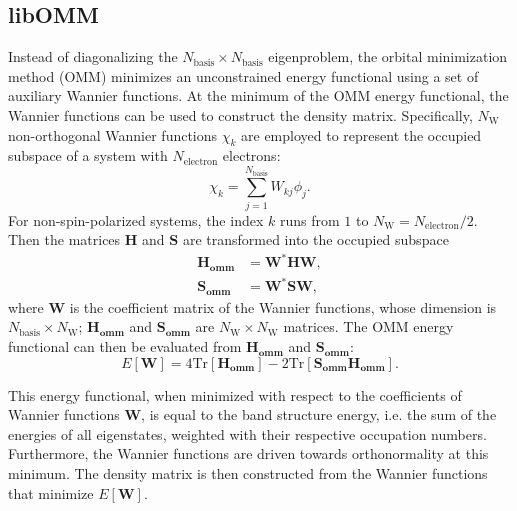 \documentclass{report}
\begin{document}
\subsection{libOMM}
\label{subsec:solvers_omm}
Instead of diagonalizing the $N_\text{basis} \times N_\text{basis}$ eigenproblem, the orbital minimization method (OMM) minimizes an unconstrained energy functional using a set of auxiliary Wannier functions. At the minimum of the OMM energy functional, the Wannier functions can be used to construct the density matrix. Specifically, $N_\text{W}$ non-orthogonal Wannier functions $\chi_k$ are employed to represent the occupied subspace of a system with $N_\text{electron}$ electrons:
\begin{equation}
\label{eq:wannier}
\chi_k = \sum_{j=1}^{N_\text{basis}} W_{kj} \phi_j .
\end{equation}
For non-spin-polarized systems, the index $k$ runs from $1$ to $N_\text{W} = N_\text{electron}/2$. Then the matrices $\boldsymbol{H}$ and $\boldsymbol{S}$ are transformed into the occupied subspace
\begin{equation}
\label{eq:reduced_ham_ovlp}
\begin{split}
\boldsymbol{H_\text{omm}} & = \boldsymbol{W}^* \boldsymbol{H} \boldsymbol{W} ,\\
\boldsymbol{S_\text{omm}} & = \boldsymbol{W}^* \boldsymbol{S} \boldsymbol{W} ,
\end{split}
\end{equation}
where $\boldsymbol{W}$ is the coefficient matrix of the Wannier functions, whose dimension is $N_\text{basis} \times N_\text{W}$; $\boldsymbol{H_\text{omm}}$ and $\boldsymbol{S_\text{omm}}$ are $N_\text{W} \times N_\text{W}$ matrices. The OMM energy functional can then be evaluated from $\boldsymbol{H_\text{omm}}$ and $\boldsymbol{S_\text{omm}}$:
\begin{equation}
\label{eq:omm_energy}
E[\boldsymbol{W}] = 4 \text{Tr}[\boldsymbol{H_\text{omm}}] - 2 \text{Tr}[\boldsymbol{S_\text{omm} H_\text{omm}}] .
\end{equation}

This energy functional, when minimized with respect to the coefficients of Wannier functions $\boldsymbol{W}$, is equal to the band structure energy, i.e. the sum of the energies of all eigenstates, weighted with their respective occupation numbers. Furthermore, the Wannier functions are driven towards orthonormality at this minimum. The density matrix is then constructed from the Wannier functions that minimize $E[\boldsymbol{W}]$.
\end{document}

